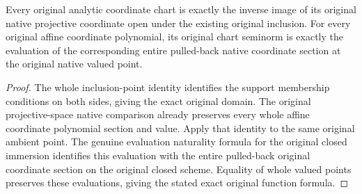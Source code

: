 \begin{lemma}
\label{lem:fc-original-analytic-native-coordinate-values}
\leanok
{}
Every original analytic coordinate chart is exactly the inverse image of its
original native projective coordinate open under the existing original inclusion.
For every original affine coordinate polynomial, its original chart seminorm
is exactly the evaluation of the corresponding entire pulled-back native
coordinate section at the original native valued point.
\end{lemma}
\begin{proof}
The whole inclusion-point identity identifies the support membership conditions
on both sides, giving the exact original domain.  The original projective-space
native comparison already preserves every whole affine coordinate polynomial
section and value.  Apply that identity to the same original ambient point.
The genuine evaluation naturality formula for the original closed immersion
identifies this evaluation with the entire pulled-back original coordinate
section on the original closed scheme.  Equality of whole valued points
preserves these evaluations, giving the stated exact original function formula.
\end{proof}
